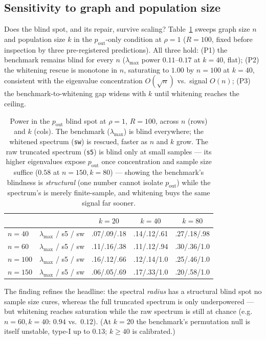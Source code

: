 \documentclass[11pt]{article}
\begin{document}
\subsection{Sensitivity to graph and population size}\label{sec:sensitivity}

Does the blind spot, and its repair, survive scaling? Table~\ref{tab:sens}
sweeps graph size $n$ and population size $k$ in the $p_{\mathrm{out}}$-only
condition at $\rho = 1$ ($R = 100$, fixed before inspection by three
pre-registered predictions). All three hold: (P1) the benchmark remains blind
for every $n$ ($\lambda_{\max}$ power $0.11$--$0.17$ at $k = 40$, flat); (P2)
the whitening rescue is monotone in $n$, saturating to $1.00$ by $n = 100$ at
$k = 40$, consistent with the eigenvalue concentration $O(\sqrt{n})$ vs.\ signal
$O(n)$; (P3) the benchmark-to-whitening gap widens with $k$ until whitening
reaches the ceiling.

\begin{table}[ht]
\centering
\small
\caption{Power in the $p_{\mathrm{out}}$ blind spot at $\rho = 1$, $R = 100$,
across $n$ (rows) and $k$ (cols). The benchmark ($\lambda_{\max}$) is blind
everywhere; the whitened spectrum (\texttt{sw}) is rescued, faster as $n$ and
$k$ grow. The raw truncated spectrum (\texttt{s5}) is blind only at small
samples --- its higher eigenvalues expose $p_{\mathrm{out}}$ once concentration
and sample size suffice ($0.58$ at $n = 150, k = 80$) --- showing the
benchmark's blindness is \emph{structural} (one number cannot isolate
$p_{\mathrm{out}}$) while the spectrum's is merely finite-sample, and whitening
buys the same signal far sooner.}
\label{tab:sens}
\begin{tabular}{ll ccc}
\toprule
 & & $k=20$ & $k=40$ & $k=80$ \\
\midrule
$n=40$  & $\lambda_{\max}$ / s5 / sw & .07/.09/.18 & .14/.12/.61 & .27/.18/.98 \\
$n=60$  & $\lambda_{\max}$ / s5 / sw & .11/.16/.38 & .11/.12/.94 & .30/.36/1.0 \\
$n=100$ & $\lambda_{\max}$ / s5 / sw & .16/.12/.66 & .12/.14/1.0 & .25/.46/1.0 \\
$n=150$ & $\lambda_{\max}$ / s5 / sw & .06/.05/.69 & .17/.33/1.0 & .20/.58/1.0 \\
\bottomrule
\end{tabular}
\end{table}

The finding refines the headline: the spectral \emph{radius} has a structural
blind spot no sample size cures, whereas the full truncated spectrum is only
underpowered --- but whitening reaches saturation while the raw spectrum is
still at chance (e.g.\ $n = 60, k = 40$: $0.94$ vs.\ $0.12$). (At $k = 20$ the
benchmark's permutation null is itself unstable, type-I up to $0.13$; $k \ge 40$
is calibrated.)
\end{document}
